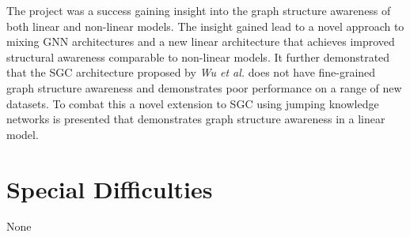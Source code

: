 \documentclass[12pt,a4paper,twoside,openright]{report}
\begin{document}
The project was a success gaining insight into the graph structure awareness of both linear and non-linear models.
The insight gained lead to a novel approach to mixing GNN architectures and a new linear architecture that achieves improved structural awareness comparable to non-linear models.
It further demonstrated that the SGC architecture proposed by \textit{Wu et al.} does not have fine-grained graph structure awareness and demonstrates poor performance on a range of new datasets.
To combat this a novel extension to SGC using jumping knowledge networks\cite{xu2018representation} is presented that demonstrates graph structure awareness in a linear model.

\section*{Special Difficulties}

None


\pagestyle{headings}

\tableofcontents









\appendix







\end{document}
